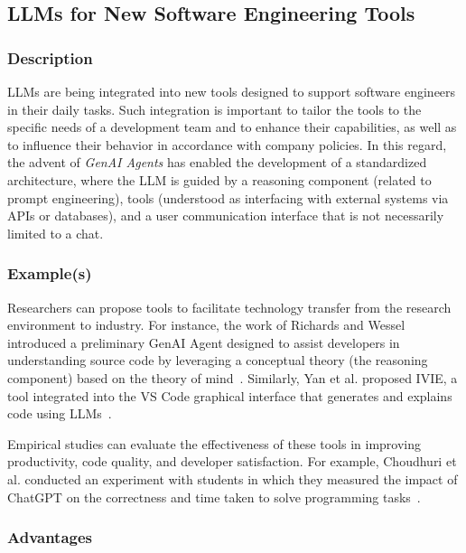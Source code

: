 \subsection{LLMs for New Software Engineering Tools}

\subsubsection{Description}

LLMs are being integrated into new tools designed to support software engineers in their daily tasks.
Such integration is important to tailor the tools to the specific needs of a development team and to enhance their capabilities, as well as to influence their behavior in accordance with company policies.
In this regard, the advent of \textit{GenAI Agents} has enabled the development of a standardized architecture, where the LLM is guided by a reasoning component (related to prompt engineering), tools (understood as interfacing with external systems via APIs or databases), and a user communication interface that is not necessarily limited to a chat.

\subsubsection{Example(s)}

Researchers can propose tools to facilitate technology transfer from the research environment to industry. 
For instance, the work of Richards and Wessel introduced a preliminary GenAI Agent designed to assist developers in understanding source code by leveraging a conceptual theory (the reasoning component) based on the theory of mind~\cite{DBLP:conf/icsm/RichardsW24}. 
Similarly, Yan et al. proposed IVIE, a tool integrated into the VS Code graphical interface that generates and explains code using LLMs~\cite{DBLP:conf/chi/YanHWH24}.

Empirical studies can evaluate the effectiveness of these tools in improving productivity, code quality, and developer satisfaction. 
For example, Choudhuri et al. conducted an experiment with students in which they measured the impact of ChatGPT on the correctness and time taken to solve programming tasks~\cite{DBLP:conf/icse/ChoudhuriLSGS24}.

\subsubsection{Advantages}

